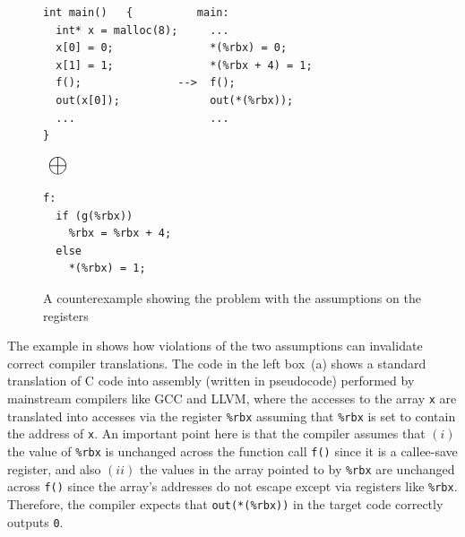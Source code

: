 \begin{figure}[t]
\hspace*{-1.9mm}
\begin{minipage}{0.55\textwidth}
\begin{Verbatim}[frame=single]
int main()   {          main:
  int* x = malloc(8);     ...
  x[0] = 0;               *(%rbx) = 0;
  x[1] = 1;               *(%rbx + 4) = 1;
  f();               -->  f();
  out(x[0]);              out(*(%rbx));
  ...                     ...
}
\end{Verbatim}
\end{minipage}
$\mbox{}~\mathlarger{\mathlarger{\mathlarger{\mathlarger{\mathlarger{\llink}}}}}~\mbox{}$
\hspace*{-1.9mm}
\begin{minipage}{0.28\textwidth}
\begin{Verbatim}[frame=single]
f:
  if (g(%rbx))
    %rbx = %rbx + 4;
  else
    *(%rbx) = 1;

\end{Verbatim}
\end{minipage}
\caption{A counterexample showing the problem with the assumptions on the registers}
\label{fig:reg-convention}
\end{figure}

%
The example in  shows how violations of the two
assumptions can invalidate correct compiler translations.
%
The code in the left box~(a) shows a standard translation of C code into assembly
(written in pseudocode) performed by mainstream compilers like GCC and LLVM, where the accesses to
the array \texttt{x} are translated into accesses via the register
\texttt{\%rbx} assuming that \texttt{\%rbx} is set to contain the
address of \texttt{x}. An important point here is that the compiler
assumes that $(i)$ the value of \texttt{\%rbx} is unchanged across
the function call \texttt{f()} since it is a callee-save register,
and also $(ii)$ the values in the array pointed to by \texttt{\%rbx} are
unchanged across \texttt{f()} since the array's addresses do not escape
except via \nip{} registers like \texttt{\%rbx}.
Therefore, the compiler expects that \texttt{out(*(\%rbx))} in the target code
correctly outputs \texttt{0}.

